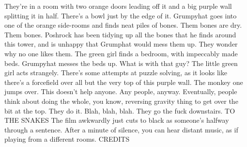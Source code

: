 They’re in a room with two orange doors leading off it and a big purple wall splitting it in half. There’s a bowl just by the edge of it. Grumpyhat goes into one of the orange side-rooms and finds neat piles of bones.\medskip
Them bones are dry.\medskip
Them bones.\medskip
Poshrock has been tidying up all the bones that he finds around this tower, and is unhappy that Grumphat would mess them up. They wonder why no one likes them.\medskip
The green girl finds a bedroom, with impeccably made beds.\medskip
Grumpyhat messes the beds up. What is with that guy?\medskip
The little green girl acts strangely.\medskip
There’s some attempts at puzzle solving, as it looks like there’s a forcefield over all but the very top of this purple wall. The monkey one jumps over. This doesn’t help anyone. Any people, anyway.\medskip
Eventually, people think about doing the whole, you know, reversing gravity thing to get over the bit at the top. They do it. Blah, blah, blah. They go the fuck downstairs.\medskip
TO THE SNAKES\medskip
The film awkwardly just cuts to black as someone's halfway through a sentence. After a minute of silence, you can hear distant music, as if playing from a different rooms.\medskip
CREDITS\medskip
